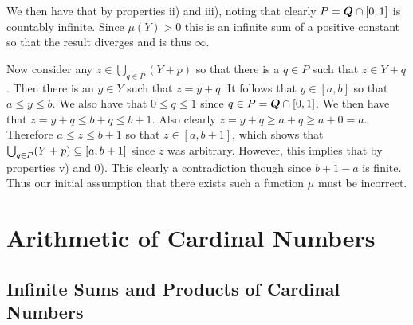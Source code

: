 \begin{questions}
{{    We then have that
    by properties ii) and iii), noting that clearly $P = \rats \cap [0,1]$ is countably infinite.
    Since $\mu(Y) > 0$ this is an infinite sum of a positive constant so that the result diverges and is thus $\infty$.

    Now consider any $z \in \bigcup_{q \in P} (Y + p)$ so that there is a $q \in P$ such that $z \in Y + q$.
    Then there is an $y \in Y$ such that $z = y + q$.
    It follows that $y \in [a, b]$ so that $a \leq y \leq b$.
    We also have that $0 \leq q \leq 1$ since $q \in P = \rats \cap [0,1]$.
    We then have that $z = y + q \leq b + q \leq b + 1$.
    Also clearly $z = y + q \geq a + q \geq a + 0 = a$.
    Therefore $a \leq z \leq b+1$ so that $z \in [a, b+1]$, which shows that $\bigcup_{q \in P} (Y + p) \ss [a, b+1]$ since $z$ was arbitrary.
    However, this implies that
    by properties v) and 0).
    This clearly a contradiction though since $b+1-a$ is finite.
    Thus our initial assumption that there exists such a function $\mu$ must be incorrect.
  }
}

\section{Arithmetic of Cardinal Numbers}
\subsection{Infinite Sums and Products of Cardinal Numbers}

\end{questions}
